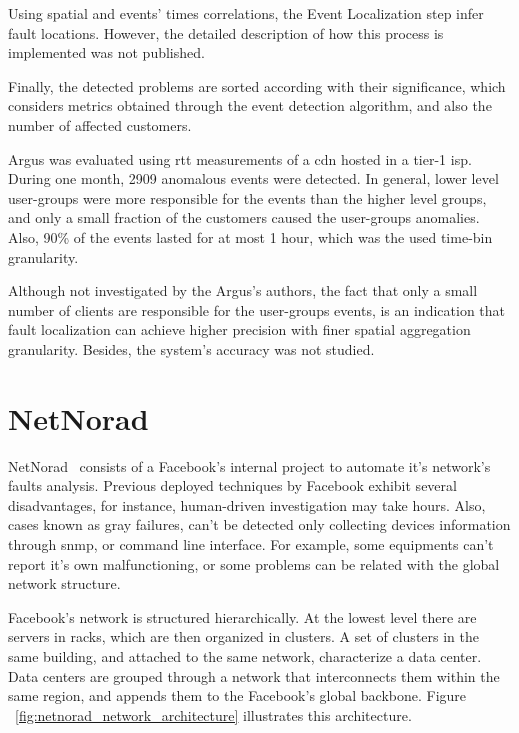 Using spatial and events' times correlations, the Event Localization step
infer fault locations.
However, the detailed description of how this
process is implemented was not published.

Finally, the detected problems are sorted according with
their significance, which considers metrics obtained
through the event detection
algorithm, and also the number of affected customers.

Argus was evaluated using \gls*{rtt} measurements of a \gls*{cdn} hosted in a
tier-1 \gls*{isp}\@.
During one month, 2909 anomalous events were detected.
In general, lower level user-groups were more responsible
for the events than the higher level groups,
and only a small fraction of the customers caused the user-groups anomalies.
Also, 90\% of the events lasted for
at most 1 hour, which was the used time-bin granularity.

Although not investigated by the Argus's authors, the fact that only a
small number
of clients are responsible for the user-groups events, is an indication that
fault localization can achieve higher precision
with finer spatial aggregation granularity. Besides, the system's accuracy was
not studied.

\section{NetNorad}

NetNorad~\cite{netnorad} consists of a Facebook's internal project to
automate it's network's faults analysis.
Previous deployed techniques by Facebook exhibit several
disadvantages, for instance,
human-driven investigation may take hours. Also, cases known as gray failures,
can't be detected only collecting devices information through \gls*{snmp},
or command line interface.
For example, some equipments can't report it's own malfunctioning, or
some problems can be related with the global network structure.

Facebook's network is structured hierarchically. At the
lowest level there are servers in racks, which are then organized in
clusters. A set of clusters in the same building, and attached to
the same network, characterize a data center. Data centers are grouped
through a network that interconnects them within the same region, and appends
them to the Facebook's global backbone. Figure
~\ref{fig:netnorad_network_architecture} illustrates this architecture.

